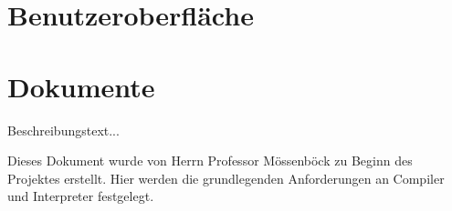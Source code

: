\documentclass[11pt, oneside]{book}   		%
\begin{document}
\ifpeter
	
\fi

\iffabian
	
	
	
	
\else
	\chapter{Benutzeroberfläche}
	
	
	
	
	
\fi

\ifpeter
	
	
	
	
	
	

	
	
	
\fi

\iffabian
	
\else
	
\fi

\ifthomas
	
\fi

\iffabian
	
\fi






\appendix
\renewcommand{\thechapter}{\Alph{chapter}}

\setcounter{chapter}{0} 

\chapter{Dokumente}
Beschreibungstext...

Dieses Dokument wurde von Herrn Professor Mössenböck zu Beginn des Projektes erstellt. Hier werden die grundlegenden Anforderungen an Compiler und Interpreter festgelegt.
\end{document}

